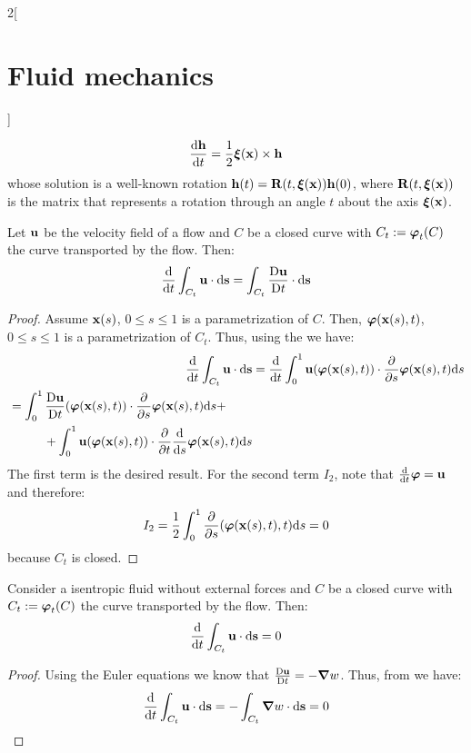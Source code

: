 \documentclass[../../../main_physics.tex]{subfiles}
\begin{document}
\begin{multicols}{2}[\section{Fluid mechanics}]
\begin{remark}
    $$
      \dv{\boldsymbol{\mathrm{h}}}{t}=\frac{1}{2} \boldsymbol{\mathrm{\xi}}(\boldsymbol{\mathrm{x}})\times \boldsymbol{\mathrm{h}}
    $$
    whose solution is a well-known rotation $\boldsymbol{\mathrm{h}}(t)=\boldsymbol{\mathrm{R}}(t,\boldsymbol{\mathrm{\xi}}(\boldsymbol{\mathrm{x}}))\boldsymbol{\mathrm{h}}(0)$, where $\boldsymbol{\mathrm{R}}(t,\boldsymbol{\mathrm{\xi}}(\boldsymbol{\mathrm{x}}))$ is the matrix that represents a rotation through an angle $t$ about the axis $\boldsymbol{\mathrm{\xi}}(\boldsymbol{\mathrm{x}})$.
  \end{remark}
  \begin{lemma}\label{FLM:trasportCurves}
    Let $\boldsymbol{\mathrm{u}}$ be the velocity field of a flow and $C$ be a closed curve with $C_t:=\boldsymbol{\mathrm{\varphi}}_t(C)$ the curve transported by the flow. Then:
    $$
      \dv{}{t}\int_{C_t}\boldsymbol{\mathrm{u}} \cdot \dd\boldsymbol{\mathrm{s}}=\int_{C_t}\frac{\mathrm{D}\boldsymbol{\mathrm{u}}}{\mathrm{D}t}\cdot \dd\boldsymbol{\mathrm{s}}
    $$
  \end{lemma}
  \begin{proof}
    Assume $\boldsymbol{\mathrm{x}}(s)$, $0\leq s\leq 1$ is a parametrization of $C$. Then, $\boldsymbol{\mathrm{\varphi}}(\boldsymbol{\mathrm{x}}(s),t)$, $0\leq s\leq 1$ is a parametrization of $C_t$. Thus, using the  we have:
    \begin{align*}
      \dv{}{t}\int_{C_t}\boldsymbol{\mathrm{u}} \cdot \dd\boldsymbol{\mathrm{s}} & =\dv{}{t}\int_0^1\boldsymbol{\mathrm{u}}(\boldsymbol{\mathrm{\varphi}}(\boldsymbol{\mathrm{x}}(s),t))\cdot \pdv{}{s}\boldsymbol{\mathrm{\varphi}}(\boldsymbol{\mathrm{x}}(s),t)\dd s \\
      \begin{split}
        & =\int_0^1\frac{\mathrm{D}\boldsymbol{\mathrm{u}}}{\mathrm{D}t}(\boldsymbol{\mathrm{\varphi}}(\boldsymbol{\mathrm{x}}(s),t))\cdot \pdv{}{s}\boldsymbol{\mathrm{\varphi}}(\boldsymbol{\mathrm{x}}(s),t)\dd s +\\
        &\hspace{1cm}+ \int_0^1\boldsymbol{\mathrm{u}}(\boldsymbol{\mathrm{\varphi}}(\boldsymbol{\mathrm{x}}(s),t))\cdot \pdv{}{t}\dv{}{s}\boldsymbol{\mathrm{\varphi}}(\boldsymbol{\mathrm{x}}(s),t)\dd s
      \end{split}
    \end{align*}
    The first term is the desired result. For the second term $I_2$, note that $\dv{}{t}\boldsymbol{\mathrm{\varphi}}=\boldsymbol{\mathrm{u}}$ and therefore:
    $$
      I_2=\frac{1}{2}\int_0^1\pdv{}{s}(\boldsymbol{\mathrm{u}}\cdot\boldsymbol{\mathrm{u}})(\boldsymbol{\mathrm{\varphi}}(\boldsymbol{\mathrm{x}}(s),t),t)\dd s=0
    $$
    because $C_t$ is closed.
  \end{proof}
  \begin{theorem}\label{FLM:kelvin}
    Consider a isentropic fluid without external forces and $C$ be a closed curve with $C_t:=\boldsymbol{\mathrm{\varphi}}_t(C)$ the curve transported by the flow. Then:
    $$
      \dv{}{t}\int_{C_t}\boldsymbol{\mathrm{u}} \cdot \dd\boldsymbol{\mathrm{s}}=0
    $$
  \end{theorem}
  \begin{proof}
    Using the Euler equations we know that $\frac{\mathrm{D}\boldsymbol{\mathrm{u}}}{\mathrm{D}t}=-\grad w$. Thus, from  we have:
    $$
      \dv{}{t}\int_{C_t}\boldsymbol{\mathrm{u}} \cdot \dd\boldsymbol{\mathrm{s}}=-\int_{C_t}\grad w\cdot \dd\boldsymbol{\mathrm{s}}=0
$$
\end{proof}
\end{multicols}
\end{document}
